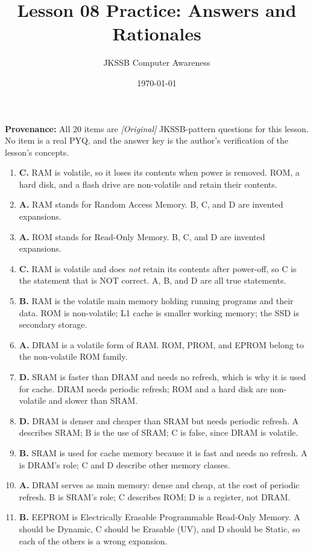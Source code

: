 \documentclass[11pt]{article}
\title{Lesson 08 Practice: Answers and Rationales}
\author{JKSSB Computer Awareness}
\date{\today}
\begin{document}
\maketitle
\noindent\textbf{Provenance:} All 20 items are \textit{[Original]}
JKSSB-pattern questions for this lesson. No item is a real PYQ, and the
answer key is the author's verification of the lesson's concepts.
\begin{enumerate}[label=\textbf{Q\arabic*.}, leftmargin=*]
\item \textbf{C.} RAM is volatile, so it loses its contents when power is
  removed. ROM, a hard disk, and a flash drive are non-volatile and retain
  their contents.
\item \textbf{A.} RAM stands for Random Access Memory. B, C, and D are
  invented expansions.
\item \textbf{A.} ROM stands for Read-Only Memory. B, C, and D are invented
  expansions.
\item \textbf{C.} RAM is volatile and does \emph{not} retain its contents
  after power-off, so C is the statement that is NOT correct. A, B, and D
  are all true statements.
\item \textbf{B.} RAM is the volatile main memory holding running programs
  and their data. ROM is non-volatile; L1 cache is smaller working memory;
  the SSD is secondary storage.
\item \textbf{A.} DRAM is a volatile form of RAM. ROM, PROM, and EPROM
  belong to the non-volatile ROM family.
\item \textbf{D.} SRAM is faster than DRAM and needs no refresh, which is
  why it is used for cache. DRAM needs periodic refresh; ROM and a hard disk
  are non-volatile and slower than SRAM.
\item \textbf{D.} DRAM is denser and cheaper than SRAM but needs periodic
  refresh. A describes SRAM; B is the use of SRAM; C is false, since DRAM is
  volatile.
\item \textbf{B.} SRAM is used for cache memory because it is fast and needs
  no refresh. A is DRAM's role; C and D describe other memory classes.
\item \textbf{A.} DRAM serves as main memory: dense and cheap, at the cost of
  periodic refresh. B is SRAM's role; C describes ROM; D is a register, not
  DRAM.
\item \textbf{B.} EEPROM is Electrically Erasable Programmable Read-Only
  Memory. A should be Dynamic, C should be Erasable (UV), and D should be
  Static, so each of the others is a wrong expansion.

\end{enumerate}
\end{document}

